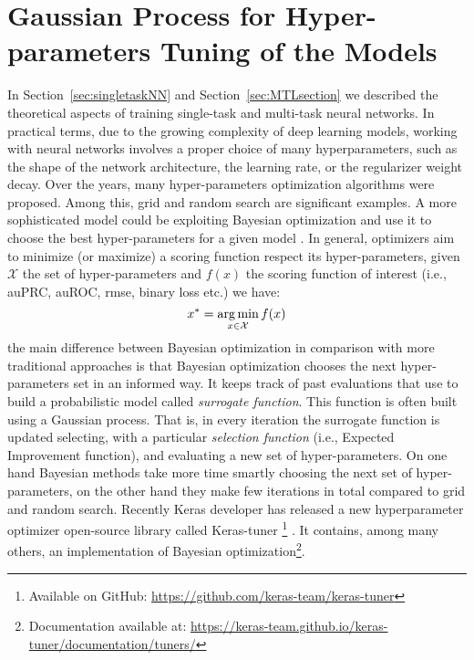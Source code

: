 \section{Gaussian Process for Hyper-parameters Tuning of the Models}
\label{sec:gaussianprocess}
In Section~\ref{sec:singletaskNN} and Section~\ref{sec:MTLsection} we
described the theoretical aspects of training single-task and multi-task neural networks. In practical terms, due to the
growing complexity of deep learning models, working with neural networks
involves a proper choice of many hyperparameters, such as the shape of
the network architecture, the learning rate, or the regularizer weight
decay. Over the years, many hyper-parameters optimization algorithms were
proposed. Among this, grid and random search \cite{BergstraB12} are significant examples. A more sophisticated model could be exploiting Bayesian optimization
and use it to choose the best hyper-parameters for a given model
\cite{SnoekGP}. In general, optimizers aim to minimize (or
maximize) a scoring function respect its hyper-parameters, given
$\mathcal{X}$ the set of hyper-parameters and $f(x)$ the scoring function of interest
(i.e., auPRC, auROC, rmse, binary loss etc.) we have: 
\[ 
x^* =  \operatorname*{arg\,min}_{x \in \mathcal{X}} f(x) 
\]
the main difference between Bayesian optimization in comparison with more
traditional approaches is that Bayesian optimization chooses the next
hyper-parameters set in an informed way. It keeps track of past evaluations
that use to build a probabilistic model called \emph{surrogate function}. This function is often built using a Gaussian process. That is, in every
iteration the surrogate function is updated selecting, with a particular
\emph{selection function} (i.e., Expected Improvement function), and
evaluating a new set of hyper-parameters. On one hand Bayesian methods
take more time smartly choosing the next set of hyper-parameters, on the other hand they make few iterations in total compared to grid and random search. 
Recently Keras developer has released a new hyperparameter optimizer
open-source library called Keras-tuner \footnote{Available on GitHub:
\url{https://github.com/keras-team/keras-tuner}}
\cite{omalley2019kerastuner}. It contains, among many others, an
implementation of Bayesian optimization\footnote{Documentation available
at: \url{https://keras-team.github.io/keras-tuner/documentation/tuners/}}.

